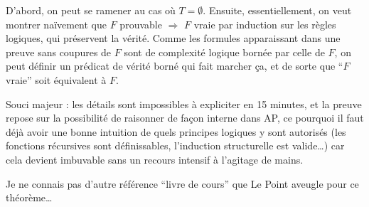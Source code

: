 \documentclass[a4paper, 11pt]{article}
\begin{document}
D'abord, on peut se ramener au cas où $T = \emptyset$. Ensuite, essentiellement,
on veut montrer naïvement que $F$ prouvable $\Rightarrow$ $F$ vraie par
induction sur les règles logiques, qui préservent la vérité. Comme les formules
apparaissant dans une preuve sans coupures de $F$ sont de complexité logique
bornée par celle de $F$, on peut définir un prédicat de vérité borné qui fait
marcher ça, et de sorte que \enquote{$F$ vraie} soit équivalent à $F$.

Souci majeur : les détails sont impossibles à expliciter en 15 minutes, et la
preuve repose sur la possibilité de raisonner de façon interne dans AP, ce
pourquoi il faut déjà avoir une bonne intuition de quels principes logiques y
sont autorisés (les fonctions récursives sont définissables, l'induction
structurelle est valide…) car cela devient imbuvable sans un recours intensif à
l'agitage de mains.

Je ne connais pas d'autre référence \enquote{livre de cours} que Le Point
aveugle pour ce théorème…
\end{document}
